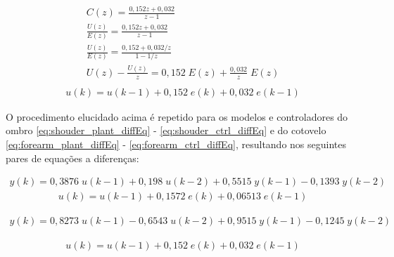 \begin{equation*}
  \begin{gathered}
    C(z) = \frac{0,152z + 0,032}{z - 1}\\[0.5cm]
    \frac{U(z)}{E(z)} = \frac{0,152z + 0,032}{z - 1}\\[0.5cm]
    \frac{U(z)}{E(z)} = \frac{0,152 + 0,032/z}{1 - 1/z}\\[0.5cm]
    U(z) - \frac{U(z)}{z} = 0,152\;E(z) + \frac{0,032}{z}\;E(z)\\[0.5cm]
  \end{gathered}
  \label{eq:base_ctrl_diffEqIntro}
\end{equation*}
\begin{equation}
  \begin{gathered}
    u(k) = u(k-1) + 0,152\; e(k) + 0,032 \;e(k-1)
  \end{gathered}
  \label{eq:base_ctrl_diffEq}
\end{equation}

O procedimento elucidado acima é repetido para os modelos e controladores do ombro \eqref{eq:shouder_plant_diffEq} - \eqref{eq:shouder_ctrl_diffEq} 
e do cotovelo \eqref{eq:forearm_plant_diffEq} - \eqref{eq:forearm_ctrl_diffEq}, resultando nos seguintes pares de equações a diferenças:

\begin{equation}
  \begin{gathered}
    y(k) = 0,3876 \;u(k-1) + 0,198 \;u(k-2) + 0,5515 \;y(k-1) - 0,1393 \;y(k-2)
  \end{gathered}
  \label{eq:shouder_plant_diffEq}
\end{equation}
\begin{equation}
  \begin{gathered}
    u(k) = u(k-1) + 0,1572 \; e(k) + 0,06513 \;e(k-1)
  \end{gathered}
  \label{eq:shouder_ctrl_diffEq}
\end{equation}

\begin{equation}
  \begin{gathered}
    y(k) = 0,8273 \;u(k-1) - 0,6543 \;u(k-2) + 0,9515 \;y(k-1) - 0,1245 \;y(k-2)
  \end{gathered}
  \label{eq:forearm_plant_diffEq}
\end{equation}

\begin{equation}
  \begin{gathered}
    u(k) = u(k-1) + 0,152\; e(k) + 0,032 \;e(k-1)
  \end{gathered}
  \label{eq:forearm_ctrl_diffEq}
\end{equation}

